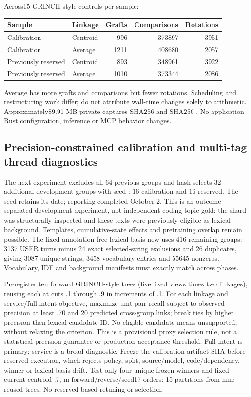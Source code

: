\documentclass[11pt]{article}
\begin{document}
Across15 GRINCH-style controls per sample:
\begin{center}
\small
\begin{tabular}{llrrr}
\toprule
Sample & Linkage & Grafts & Comparisons & Rotations \\
\midrule
Calibration & Centroid & 996 & 373897 & 3951 \\
Calibration & Average & 1211 & 408680 & 2057 \\
Previously reserved & Centroid & 893 & 348961 & 3922 \\
Previously reserved & Average & 1010 & 373344 & 2086 \\
\bottomrule
\end{tabular}
\end{center}
Average has more grafts and
comparisons but fewer rotations. Scheduling and restructuring work differ;
do not attribute wall-time changes solely to arithmetic. Approximately89.91 MB
private captures  SHA256
and  SHA256
.
No application Rust configuration, inference or MCP behavior changes.

\subsection{Precision-constrained calibration and multi-tag thread diagnostics}
The next experiment excludes all 64 previous groups and hash-selects 32 additional
development groups with seed
: 16 calibration and 16 reserved.
The seed retains its date; reporting completed October 2. This is an
outcome-separated development experiment, not independent coding-topic gold:
the shard was structurally inspected and these texts were previously eligible
as lexical background. Templates, cumulative-state effects and pretraining
overlap remain possible. The fixed annotation-free lexical basis now uses 416
remaining groups: 3137 USER turns minus 24 exact selected-string exclusions and 26
duplicates, giving 3087 unique strings, 3458 vocabulary entries and 55645 nonzeros.
Vocabulary, IDF and background manifests must exactly match across phases.

Preregister ten forward GRINCH-style trees (five fixed views times two linkages),
reusing each at cuts .1 through .9 in increments of .1. For each linkage and
service/full-intent objective, maximize unit-pair recall subject to observed
precision at least .70 and 20 predicted cross-group links; break ties by higher
precision then lexical candidate ID. No eligible candidate means unsupported,
without relaxing the criterion. This is a provisional proxy selection rule,
not a statistical precision guarantee or production acceptance threshold.
Full-intent is primary; service is a broad diagnostic. Freeze the calibration
artifact SHA before reserved execution, which rejects policy, split, source/model,
code/dependency, winner or lexical-basis drift. Test only four unique frozen
winners and fixed current-centroid .7, in forward/reverse/seed17 orders:
15 partitions from nine reused trees. No reserved-based retuning or selection.
\end{document}
